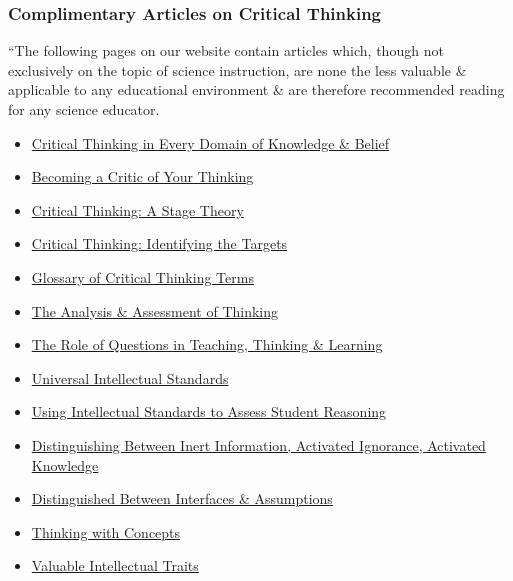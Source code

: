 \documentclass[oneside]{book}
\numberwithin{equation}{section}
\begin{document}
\subsubsection{Complimentary Articles on Critical Thinking}
``The following pages on our website contain articles which, though not exclusively on the topic of science instruction, are none the less valuable \& applicable to any educational environment \& are therefore recommended reading for any science educator.
\begin{itemize}
	\item \href{https://www.criticalthinking.org/pages/critical-thinking-in-every-domain-of-knowledge-and-belief/698}{Critical Thinking in Every Domain of Knowledge \& Belief}
	\item \href{https://www.criticalthinking.org/articles/becoming-a-critic.cfm}{Becoming a Critic of Your Thinking}
	\item \href{https://www.criticalthinking.org/articles/ct-development-a-stage-theory.cfm}{Critical Thinking: A Stage Theory}
	\item \href{https://www.criticalthinking.org/articles/ct-identifying-targets.cfm}{Critical Thinking: Identifying the Targets}
	\item \href{https://www.criticalthinking.org/articles/glossary.cfm}{Glossary of Critical Thinking Terms}
	\item \href{https://www.criticalthinking.org/articles/helping-students-assess-their-thinking.cfm}{The Analysis \& Assessment of Thinking}
	\item \href{https://www.criticalthinking.org/articles/thinking-some-purpose.cfm}{The Role of Questions in Teaching, Thinking \& Learning}
	\item \href{https://www.criticalthinking.org/articles/universal-intellectual-standards.cfm}{Universal Intellectual Standards}
	\item \href{https://www.criticalthinking.org/articles/TRK12-using-intellectual-standards.cfm}{Using Intellectual Standards to Assess Student Reasoning}
	\item \href{https://www.criticalthinking.org/articles/distinguishing-inert-information.cfm}{Distinguishing Between Inert Information, Activated Ignorance, Activated Knowledge}
	\item \href{https://www.criticalthinking.org/articles/ct-distinguishing-inferencs.cfm}{Distinguished Between Interfaces \& Assumptions}
	\item \href{https://www.criticalthinking.org/articles/thinking-with-concepts.cfm}{Thinking with Concepts}
	\item \href{https://www.criticalthinking.org/articles/valuable-intellectual-traits.cfm}{Valuable Intellectual Traits}
\end{itemize}
\end{document}
